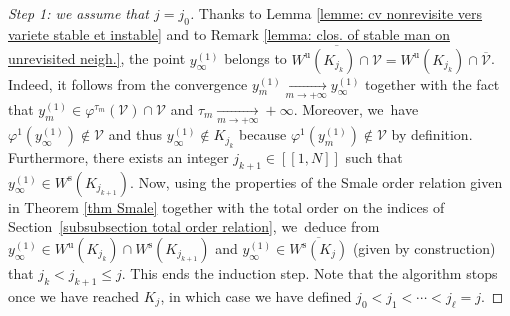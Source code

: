 \documentclass[JEP,XML,SOM,Unicode,NoEqCountersInSection,NoFloatCountersInSection,published]{cedram}
\newcommand{\lcr}{[\![}
\newcommand{\rcr}{]\!]}
\newcommand{\rs}{\mathrm{s}}
\newcommand{\ru}{\mathrm{u}}
\theoremstyle{definition}
\theoremstyle{plain}
\newcommand{\Vcal}{\mathcal{V}}
\begin{document}
\begin{proof}[Step 1: we assume that $j = j_0$]
Thanks to Lemma \ref{lemme: cv nonrevisite vers variete stable et instable} and to Remark \ref{lemma: clos. of stable man on unrevisited neigh.}, the point $y_{\infty}^{(1)}$ belongs to $\overline{W^\ru (K_{j_k})\cap \Vcal} = W^\ru (K_{j_k})\cap \overline{\Vcal}$. Indeed, it follows from the convergence $y_m^{(1)} \underset{m \to +\infty}{\to} y_{\infty}^{(1)}$ together with the fact that $y_m^{(1)} \in \varphi^{\tau_m} (\Vcal) \cap \Vcal$ and $\tau_m \underset{m \to +\infty}{\to} +\infty$. Moreover, we~have $\varphi^{1} (y_{\infty}^{(1)}) \notin \Vcal$ and thus $y_{\infty}^{(1)} \notin K_{j_k}$ because $\varphi^1 (y_m^{(1)}) \notin \Vcal$ by definition. Furthermore, there exists an integer $ j_{k +1}\in\lcr1,N\rcr$ such that $y_{\infty}^{(1)} \in W^\rs (K_{j_{k+1}})$. Now, using the properties of the Smale order relation given in Theorem \ref{thm Smale} together with the total order on the indices of Section~\ref{subsubsection total order relation}, we~deduce from $y_{\infty}^{(1)} \in W^\ru (K_{j_{k}}) \cap W^\rs (K_{j_{k+1}})$ and $y_{\infty}^{(1)} \in \overline{W^\rs (K_j)}$ (given by construction) that $j_k < j_{k+1} \leq j$.
This ends the induction step. Note that the algorithm stops once we have reached $K_j$, in which case we have defined $j_0 < j_1 < \cdots < j_{\ell} = j$.


\end{proof}
\end{document}
